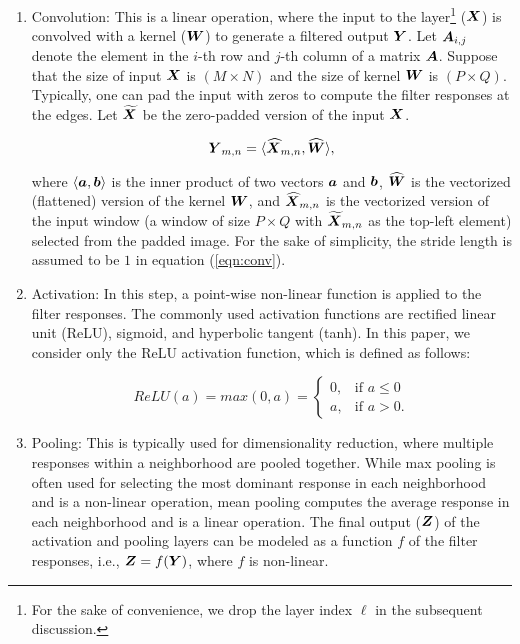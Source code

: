 \documentclass[letterpaper]{article} %
\newcommand{\vect}[1]{\mbox{\boldmath$#1$}}
\begin{document}
\begin{enumerate}
    \item Convolution: This is a linear operation, where the input to the layer\footnote{For the sake of convenience, we drop the layer index $\ell$ in the subsequent discussion.} ($\vect{X}$) is convolved with a kernel ($\vect{W}$) to generate a filtered output $\vect{Y}$. Let $\vect{A}_{i,j}$ denote the element in the $i$-th row and $j$-th column of a matrix $\vect{A}$. Suppose that the size of input $\vect{X}$ is $(M \times N)$ and the size of kernel $\vect{W}$ is $(P \times Q)$. Typically, one can pad the input with zeros to compute the filter responses at the edges. Let $\vect{\widetilde{X}}$ be the zero-padded version of the input $\vect{X}$.

    \begin{equation}
        \label{eqn:conv}
        \vect{Y}_{m,n} = \langle \vect{\widehat{X}}_{m,n},  \vect{\widehat{W}}\rangle,
    \end{equation}

    \noindent where $\langle \vect{a}, \vect{b}\rangle$ is the inner product of two vectors $\vect{a}$ and $\vect{b}$, $\vect{\widehat{W}}$ is the vectorized (flattened) version of the kernel $\vect{W}$, and $\vect{\widehat{X}}_{m,n}$ is the vectorized version of the input window (a window of size $P \times Q$ with $\vect{\widetilde{X}}_{m,n}$ as the top-left element) selected from the padded image. For the sake of simplicity, the stride length is assumed to be $1$ in equation (\ref{eqn:conv}).

    \item Activation: In this step, a point-wise non-linear function is applied to the filter responses. The commonly used activation functions are rectified linear unit (ReLU), sigmoid, and hyperbolic tangent (tanh). In this paper, we consider only the ReLU activation function, which is defined as follows:

     \begin{equation}
        \label{eqn:origReLU}
       ReLU(a) = max(0,a) = \begin{cases} 0, & \mbox{if } a \leq 0 \\ a, & \mbox{if } a > 0. \end{cases}
    \end{equation}

    \item Pooling: This is typically used for dimensionality reduction, where multiple responses within a neighborhood are pooled together. While max pooling is often used for selecting the most dominant response in each neighborhood and is a non-linear operation, mean pooling computes the average response in each neighborhood and is a linear operation. The final output ($\vect{Z}$) of the activation and pooling layers can be modeled as a function $f$ of the filter responses, i.e., $\vect{Z} = f(\vect{Y})$, where $f$ is non-linear.
\end{enumerate}
\end{document}
